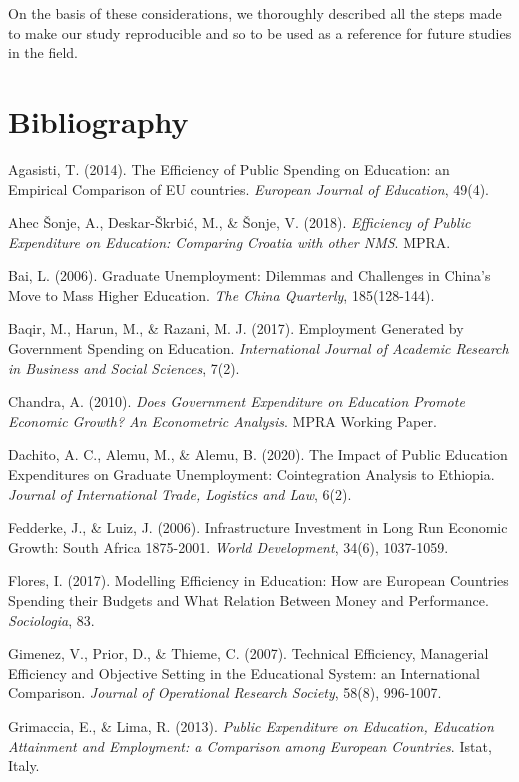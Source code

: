 \documentclass[
]{article}
\begin{document}
On the basis of these considerations, we thoroughly described all the
steps made to make our study reproducible and so to be used as a
reference for future studies in the field.

\hypertarget{bibliography}{%
\section{Bibliography}\label{bibliography}}

Agasisti, T. (2014). The Efficiency of Public Spending on Education: an
Empirical Comparison of EU countries. \emph{European Journal of
Education}, 49(4).

Ahec Šonje, A., Deskar-Škrbić, M., \& Šonje, V. (2018). \emph{Efficiency
of Public Expenditure on Education: Comparing Croatia with other NMS}.
MPRA.

Bai, L. (2006). Graduate Unemployment: Dilemmas and Challenges in
China's Move to Mass Higher Education. \emph{The China Quarterly},
185(128-144).

Baqir, M., Harun, M., \& Razani, M. J. (2017). Employment Generated by
Government Spending on Education. \emph{International Journal of
Academic Research in Business and Social Sciences}, 7(2).

Chandra, A. (2010). \emph{Does Government Expenditure on Education
Promote Economic Growth? An Econometric Analysis}. MPRA Working Paper.

Dachito, A. C., Alemu, M., \& Alemu, B. (2020). The Impact of Public
Education Expenditures on Graduate Unemployment: Cointegration Analysis
to Ethiopia. \emph{Journal of International Trade, Logistics and Law},
6(2).

Fedderke, J., \& Luiz, J. (2006). Infrastructure Investment in Long Run
Economic Growth: South Africa 1875-2001. \emph{World Development},
34(6), 1037-1059.

Flores, I. (2017). Modelling Efficiency in Education: How are European
Countries Spending their Budgets and What Relation Between Money and
Performance. \emph{Sociologia}, 83.

Gimenez, V., Prior, D., \& Thieme, C. (2007). Technical Efficiency,
Managerial Efficiency and Objective Setting in the Educational System:
an International Comparison. \emph{Journal of Operational Research
Society}, 58(8), 996-1007.

Grimaccia, E., \& Lima, R. (2013). \emph{Public Expenditure on
Education, Education Attainment and Employment: a Comparison among
European Countries}. Istat, Italy.
\end{document}
